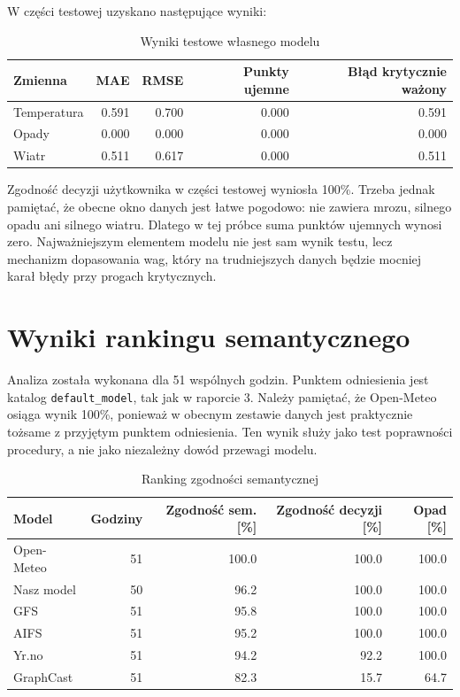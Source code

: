 \documentclass[a4paper,12pt]{article}
\begin{document}
\noindent
W części testowej uzyskano następujące wyniki:
\begin{table}[h]
\centering
\caption{Wyniki testowe własnego modelu}
\begin{tabular}{lrrrr}
\toprule
Zmienna & MAE & RMSE & Punkty ujemne & Błąd krytycznie ważony \\
\midrule
Temperatura & 0.591 & 0.700 & 0.000 & 0.591 \\
Opady & 0.000 & 0.000 & 0.000 & 0.000 \\
Wiatr & 0.511 & 0.617 & 0.000 & 0.511 \\
\bottomrule
\end{tabular}
\end{table}

\noindent
Zgodność decyzji użytkownika w części testowej wyniosła 100\%. Trzeba jednak
pamiętać, że obecne okno danych jest łatwe pogodowo: nie zawiera mrozu, silnego
opadu ani silnego wiatru. Dlatego w tej próbce suma punktów ujemnych wynosi
zero. Najważniejszym elementem modelu nie jest sam wynik testu, lecz mechanizm
dopasowania wag, który na trudniejszych danych będzie mocniej karał błędy przy
progach krytycznych.


\section{Wyniki rankingu semantycznego}

Analiza została wykonana dla 51 wspólnych godzin. Punktem odniesienia jest
katalog \texttt{default\_model}, tak jak w raporcie 3. Należy pamiętać, że
Open-Meteo osiąga wynik 100\%, ponieważ w obecnym zestawie danych jest
praktycznie tożsame z przyjętym punktem odniesienia. Ten wynik służy jako test
poprawności procedury, a nie jako niezależny dowód przewagi modelu.

\begin{table}[h]
\centering
\caption{Ranking zgodności semantycznej}
\begin{tabular}{lrrrr}
\toprule
Model & Godziny & Zgodność sem. [\%] & Zgodność decyzji [\%] & Opad [\%] \\
\midrule
Open-Meteo & 51 & 100.0 & 100.0 & 100.0 \\
Nasz model & 50 & 96.2 & 100.0 & 100.0 \\
GFS & 51 & 95.8 & 100.0 & 100.0 \\
AIFS & 51 & 95.2 & 100.0 & 100.0 \\
Yr.no & 51 & 94.2 & 92.2 & 100.0 \\
GraphCast & 51 & 82.3 & 15.7 & 64.7 \\
\bottomrule
\end{tabular}
\end{table}
\end{document}
